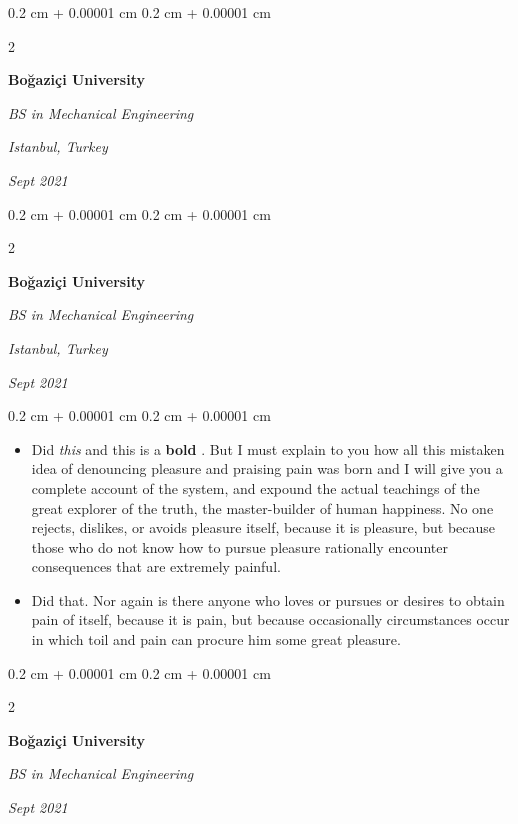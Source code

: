 \documentclass[10pt, letterpaper]{article}
\newenvironment{highlights}{
    \begin{itemize}[
        topsep=0.10 cm,
        parsep=0.10 cm,
        partopsep=0pt,
        itemsep=0pt,
        leftmargin=0.4 cm + 10pt
    ]
}{
    \end{itemize}
} %
\newenvironment{onecolentry}{
    \begin{adjustwidth}{
        0.2 cm + 0.00001 cm
    }{
        0.2 cm + 0.00001 cm
    }
}{
    \end{adjustwidth}
} %
\newenvironment{twocolentry}[2][]{
    \onecolentry
    \def\secondColumn{#2}
    \setcolumnwidth{\fill, 4.5 cm}
    \begin{paracol}{2}
}{
    \switchcolumn \raggedleft \secondColumn
    \end{paracol}
    \endonecolentry
} %
\let\hrefWithoutArrow\href
\renewcommand{\href}[2]{\hrefWithoutArrow{#1}{\ifthenelse{\equal{#2}{}}{ }{#2 }\raisebox{.15ex}{\footnotesize \faExternalLink*}}}
\begin{document}
        \vspace{0.2 cm}

        \begin{twocolentry}{
        \textit{Istanbul, Turkey}    
            
        \textit{Sept 2021}}
            \textbf{Boğaziçi University}

            \textit{BS in Mechanical Engineering}
        \end{twocolentry}



        \vspace{0.2 cm}

        \begin{twocolentry}{
        \textit{Istanbul, Turkey}    
            
        \textit{Sept 2021}}
            \textbf{Boğaziçi University}

            \textit{BS in Mechanical Engineering}
        \end{twocolentry}

        \vspace{0.10 cm}
        \begin{onecolentry}
            \begin{highlights}
                \item Did \textit{this} and this is a \textbf{bold} \href{https://example.com}{link}. But I must explain to you how all this mistaken idea of denouncing pleasure and praising pain was born and I will give you a complete account of the system, and expound the actual teachings of the great explorer of the truth, the master-builder of human happiness. No one rejects, dislikes, or avoids pleasure itself, because it is pleasure, but because those who do not know how to pursue pleasure rationally encounter consequences that are extremely painful.
                \item Did that. Nor again is there anyone who loves or pursues or desires to obtain pain of itself, because it is pain, but because occasionally circumstances occur in which toil and pain can procure him some great pleasure.
            \end{highlights}
        \end{onecolentry}


        \vspace{0.2 cm}

        \begin{twocolentry}{
            
            
        \textit{Sept 2021}}
            \textbf{Boğaziçi University}

            \textit{BS in Mechanical Engineering}
        \end{twocolentry}
\end{document}
